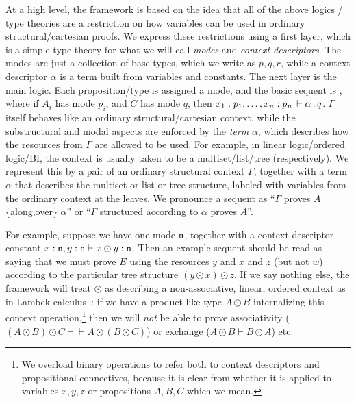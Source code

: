 At a high level, the framework is based on the idea that all of the
above logics / type theories are a restriction on how variables can be
used in ordinary structural/cartesian proofs.  We express these
restrictions using a first layer, which is a simple type theory for what
we will call \emph{modes} and \emph{context descriptors}.  The modes are
just a collection of base types, which we write as $p,q,r$, while a
context descriptor $\alpha$ is a term built from variables and
constants.  The next layer is the main logic.  Each proposition/type is
assigned a mode, and the basic sequent is , where if $A_i$ has mode $p_i$, and $C$ has mode $q$,
then $x_1 : p_1,\ldots, x_n : p_n \, \vdash \alpha \, \mathit{:} \, q$.  $\Gamma$ itself
behaves like an ordinary structural/cartesian context, while the
substructural and modal aspects are enforced by the \emph{term}
$\alpha$, which describes how the resources from $\Gamma$ are allowed to
be used.  For example, in linear logic/ordered logic/BI, the context is
usually taken to be a multiset/list/tree (respectively).  We represent
this by a pair of an ordinary structural context $\Gamma$, together with
a term $\alpha$ that describes the multiset or list or tree structure,
labeled with variables from the ordinary context at the leaves.  We
pronounce a sequent  as ``$\Gamma$ proves $A$
\{along,over\} $\alpha$'' or ``$\Gamma$ structured according to $\alpha$
proves $A$''.

For example, suppose we have one mode $\mathsf{n}$, together with a context
descriptor constant $x : \mathsf{n}, y:\mathsf{n} \vdash x \odot y : \mathsf{n}$.
Then an example sequent 
should be read as saying that we must prove $E$ using the resources $y$
and $x$ and $z$ (but not $w$) according to the particular tree structure
${(y \odot x) \odot z}$.  If we say nothing else, the framework will
treat $\odot$ as describing a non-associative, linear, ordered context
as in Lambek calculus~\citep{lambek58calculus}: if we have a
product-like type $A \odot B$ internalizing this context
operation,\footnote{We overload binary operations to refer both to
  context descriptors and propositional connectives, because it is clear
  from whether it is applied to variables $x,y,z$ or propositions
  $A,B,C$ which we mean.}  then we will \emph{not} be able to prove
associativity ($(A \odot B) \odot C \dashv\vdash A \odot (B \odot C)$)
or exchange ($A \odot B \vdash B \odot A$) etc.  

